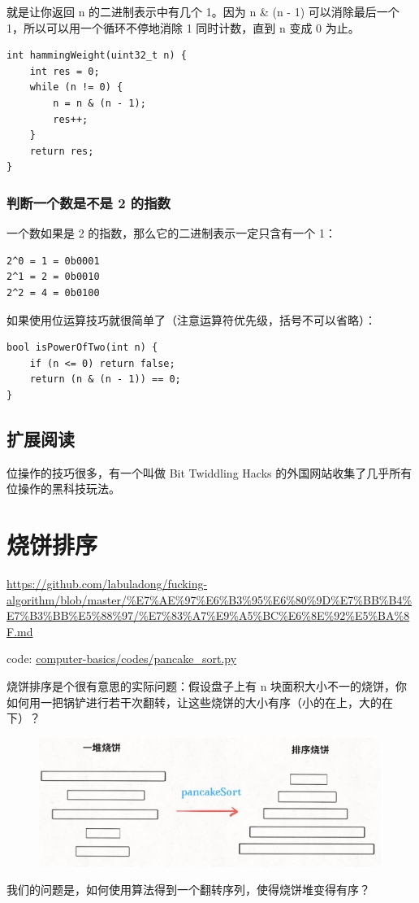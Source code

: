 \documentclass[12pt]{article}
\begin{document}
就是让你返回 n 的二进制表示中有几个 1。因为 n \& (n - 1) 可以消除最后一个 1，所以可以用一个循环不停地消除 1 同时计数，直到 n 变成 0 为止。
\begin{lstlisting}
int hammingWeight(uint32_t n) {
    int res = 0;
    while (n != 0) {
        n = n & (n - 1);
        res++;
    }
    return res;
}
\end{lstlisting}

\subsubsection{判断一个数是不是 2 的指数}
一个数如果是 2 的指数，那么它的二进制表示一定只含有一个 1：
\begin{lstlisting}
2^0 = 1 = 0b0001
2^1 = 2 = 0b0010
2^2 = 4 = 0b0100
\end{lstlisting}

如果使用位运算技巧就很简单了（注意运算符优先级，括号不可以省略）：
\begin{lstlisting}
bool isPowerOfTwo(int n) {
    if (n <= 0) return false;
    return (n & (n - 1)) == 0;
}
\end{lstlisting}

\subsection{扩展阅读}
位操作的技巧很多，有一个叫做 Bit Twiddling Hacks 的外国网站收集了几乎所有位操作的黑科技玩法。

\section{烧饼排序}
\url{https://github.com/labuladong/fucking-algorithm/blob/master/%E7%AE%97%E6%B3%95%E6%80%9D%E7%BB%B4%E7%B3%BB%E5%88%97/%E7%83%A7%E9%A5%BC%E6%8E%92%E5%BA%8F.md}

code: \url{computer-basics/codes/pancake_sort.py}

烧饼排序是个很有意思的实际问题：假设盘子上有 n 块面积大小不一的烧饼，你如何用一把锅铲进行若干次翻转，让这些烧饼的大小有序（小的在上，大的在下）？
\begin{figure}[H]
    \centering
    \includegraphics[width=.5\textwidth]{fig/Pancake_Sorting_1.png}
\end{figure}
我们的问题是，如何使用算法得到一个翻转序列，使得烧饼堆变得有序？
\end{document}
